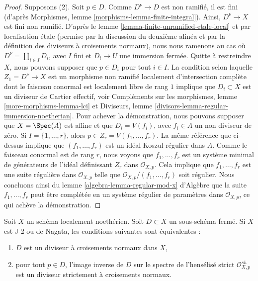 \begin{proof}
\medskip\noindent
Supposons (2). Soit $p \in D$. Comme $D^\nu \to D$ est non ramifié, il est
fini (d'après Morphismes, lemme \ref{morphisms-lemma-finite-integral}).
Ainsi, $D^\nu \to X$ est fini non ramifié.
D'après le lemme \ref{lemma-finite-unramified-etale-local}
et par localisation \'etale (permise par la discussion
du deuxième alinéa et par la définition des diviseurs à
croisements normaux), nous nous ramenons au cas où
$D^\nu = \coprod_{i \in I} D_i$,
avec $I$ fini et $D_i \to U$ une immersion fermée.
Quitte à restreindre $X$, nous pouvons supposer
que $p \in D_i$ pour tout $i \in I$. La condition selon laquelle $Z_1 =  D^\nu \to X$ est un
morphisme non ramifié localement d'intersection complète
dont le faisceau conormal est localement libre de rang $1$
implique que $D_i \subset X$ est un diviseur de Cartier effectif, voir
Compléments sur les morphismes, lemme \ref{more-morphisms-lemma-lci} et
Diviseurs, lemme \ref{divisors-lemma-regular-immersion-noetherian}.
Pour achever la démonstration, nous pouvons supposer que $X = \Spec(A)$ est affine
et que $D_i = V(f_i)$, avec $f_i \in A$ un non diviseur de zéro.
Si $I = \{1, \ldots, r\}$, alors $p \in Z_r = V(f_1, \ldots, f_r)$.
La même référence que ci-dessus implique que
$(f_1, \ldots, f_r)$ est un idéal Koszul-régulier dans $A$.
Comme le faisceau conormal est de rang $r$, nous voyons que
$f_1, \ldots, f_r$ est un système minimal de générateurs de
l'idéal définissant $Z_r$ dans $\mathcal{O}_{X, p}$.
Cela implique que $f_1, \ldots, f_r$ est une suite régulière
dans $\mathcal{O}_{X, p}$ telle que $\mathcal{O}_{X, p}/(f_1, \ldots, f_r)$
soit régulier. Nous concluons ainsi du
lemme \ref{algebra-lemma-regular-mod-x} d'Algèbre
que la suite $f_1, \ldots, f_r$ peut être complétée en un système régulier de paramètres
dans $\mathcal{O}_{X, p}$, ce qui achève la démonstration.
\end{proof}

\begin{lemma}
\label{lemma-characterize-normal-crossings}
Soit $X$ un schéma localement noethérien. Soit $D \subset X$ un sous-schéma
fermé. Si $X$ est J-2 ou de Nagata, les conditions suivantes sont équivalentes :
\begin{enumerate}
\item $D$ est un diviseur à croisements normaux dans $X$,
\item pour tout $p \in D$, l'image inverse de $D$ sur le spectre de
l'hensélisé strict $\mathcal{O}_{X, p}^{sh}$
est un diviseur strictement à croisements normaux.
\end{enumerate}
\end{lemma}

